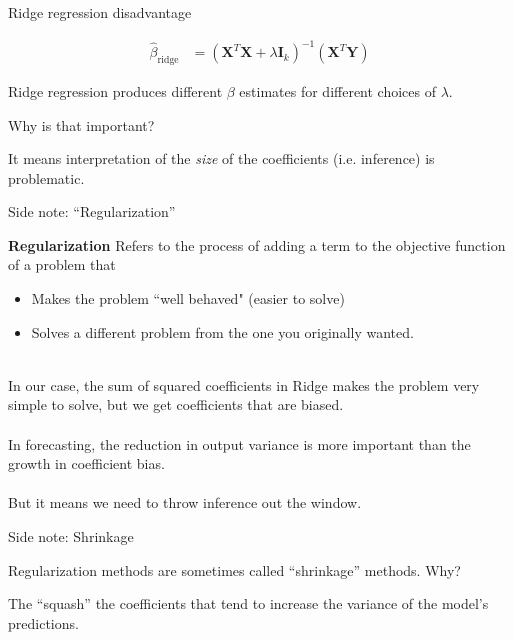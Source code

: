 \documentclass[mathserif, aspectratio=169]{beamer}
\begin{document}
\begin{frame}{Ridge regression disadvantage}

\begin{align*}
\hat{\beta}_\text{ridge} &=\left(\mathbf{X}^T\mathbf{X} + \lambda\mathbf{I}_k\right)^{-1} \left(\mathbf{X}^T\mathbf{Y}\right)
\end{align*}

\pause
Ridge regression produces different $\beta$ estimates for different choices of $\lambda$.

\vspace{5mm}

Why is that important?
\pause
\vspace{5mm}

It means interpretation of the \textit{size} of the coefficients (i.e. inference) is problematic.

\end{frame}


\begin{frame}{Side note:  ``Regularization''}

\textbf{Regularization} Refers to the process of adding a term to the objective function of a problem that 
\begin{itemize}
\item Makes the problem ``well behaved" (easier to solve)
\item Solves a different problem from the one you originally wanted.\\~\\
\end{itemize}

In our case, the sum of squared coefficients in Ridge makes the problem very simple to solve, but we get coefficients that are biased.\\~\\

In forecasting, the reduction in output variance is more important than the growth in coefficient bias.   \\~\\

But it means we need to throw inference out the window.  
\end{frame}

\begin{frame}{Side note: Shrinkage}

Regularization methods are sometimes called ``shrinkage'' methods.  Why?

\pause\vspace{5mm}

The ``squash'' the coefficients that tend to increase the variance of the model's predictions.

\end{frame}
\end{document}
